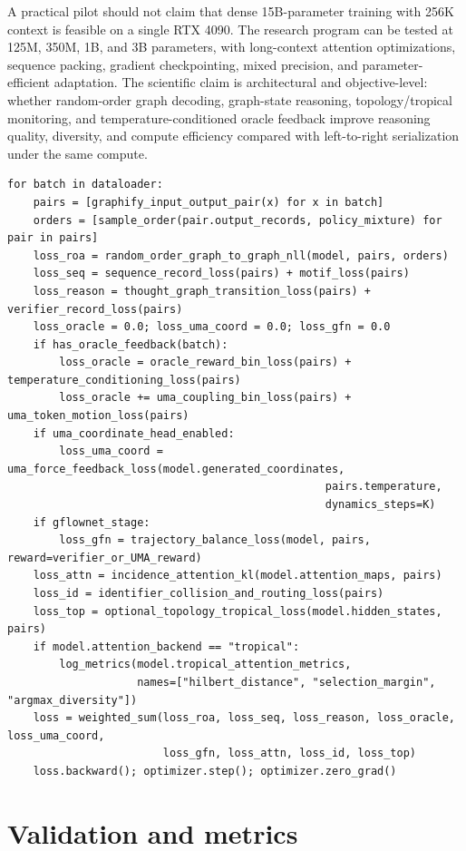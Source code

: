 \documentclass[11pt]{article}
\newcommand{\1}{\mathbf{1}}
\begin{document}
A practical pilot should not claim that dense 15B-parameter training with 256K context is feasible on a single RTX 4090. The research program can be tested at 125M, 350M, 1B, and 3B parameters, with long-context attention optimizations, sequence packing, gradient checkpointing, mixed precision, and parameter-efficient adaptation. The scientific claim is architectural and objective-level: whether random-order graph decoding, graph-state reasoning, topology/tropical monitoring, and temperature-conditioned oracle feedback improve reasoning quality, diversity, and compute efficiency compared with left-to-right serialization under the same compute.

\begin{lstlisting}[caption={Full multitask training loop.}]
for batch in dataloader:
    pairs = [graphify_input_output_pair(x) for x in batch]
    orders = [sample_order(pair.output_records, policy_mixture) for pair in pairs]
    loss_roa = random_order_graph_to_graph_nll(model, pairs, orders)
    loss_seq = sequence_record_loss(pairs) + motif_loss(pairs)
    loss_reason = thought_graph_transition_loss(pairs) + verifier_record_loss(pairs)
    loss_oracle = 0.0; loss_uma_coord = 0.0; loss_gfn = 0.0
    if has_oracle_feedback(batch):
        loss_oracle = oracle_reward_bin_loss(pairs) + temperature_conditioning_loss(pairs)
        loss_oracle += uma_coupling_bin_loss(pairs) + uma_token_motion_loss(pairs)
    if uma_coordinate_head_enabled:
        loss_uma_coord = uma_force_feedback_loss(model.generated_coordinates,
                                                 pairs.temperature,
                                                 dynamics_steps=K)
    if gflownet_stage:
        loss_gfn = trajectory_balance_loss(model, pairs, reward=verifier_or_UMA_reward)
    loss_attn = incidence_attention_kl(model.attention_maps, pairs)
    loss_id = identifier_collision_and_routing_loss(pairs)
    loss_top = optional_topology_tropical_loss(model.hidden_states, pairs)
    if model.attention_backend == "tropical":
        log_metrics(model.tropical_attention_metrics,
                    names=["hilbert_distance", "selection_margin", "argmax_diversity"])
    loss = weighted_sum(loss_roa, loss_seq, loss_reason, loss_oracle, loss_uma_coord,
                        loss_gfn, loss_attn, loss_id, loss_top)
    loss.backward(); optimizer.step(); optimizer.zero_grad()
\end{lstlisting}

\section{Validation and metrics}
\end{document}
